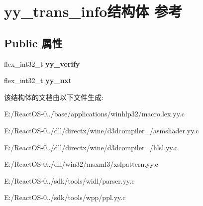 \hypertarget{structyy__trans__info}{}\section{yy\+\_\+trans\+\_\+info结构体 参考}
\label{structyy__trans__info}
\subsection*{Public 属性}
\begin{DoxyCompactItemize}
\item 
\mbox{\label{structyy__trans__info_a5c9f61e770deef50bd4e697310342fe9}} 
flex\+\_\+int32\+\_\+t {\bfseries yy\+\_\+verify}
\item 
\mbox{\label{structyy__trans__info_ae0715250c2bef261e596e77e0030f13e}} 
flex\+\_\+int32\+\_\+t {\bfseries yy\+\_\+nxt}
\end{DoxyCompactItemize}


该结构体的文档由以下文件生成\+:\begin{DoxyCompactItemize}
\item 
E\+:/\+React\+O\+S-\/0../base/applications/winhlp32/macro.\+lex.\+yy.\+c\item 
E\+:/\+React\+O\+S-\/0../dll/directx/wine/d3dcompiler\+\_/asmshader.\+yy.\+c\item 
E\+:/\+React\+O\+S-\/0../dll/directx/wine/d3dcompiler\+\_/hlsl.\+yy.\+c\item 
E\+:/\+React\+O\+S-\/0../dll/win32/msxml3/xslpattern.\+yy.\+c\item 
E\+:/\+React\+O\+S-\/0../sdk/tools/widl/parser.\+yy.\+c\item 
E\+:/\+React\+O\+S-\/0../sdk/tools/wpp/ppl.\+yy.\+c\end{DoxyCompactItemize}
